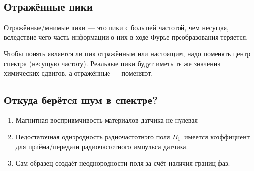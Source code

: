 \documentclass[12pt, a4paper, oneside]{article}	%
\begin{document}
	\subsection {Отражённые пики}

	Отражённые{\slash}мнимые пики --- это пики с большей частотой, чем несущая, вследствие чего
	часть информации о них в ходе Фурье преобразования теряется.

	Чтобы понять является ли пик отражённым или настоящим, надо поменять центр спектра (несущую
	частоту). Реальные пики будут иметь те же значения химических сдвигов, а отражённые --- поменяют.

	\subsection {Откуда берётся шум в спектре?}

		\begin{enumerate}
			\item
				Магнитная восприимчивость материалов датчика не нулевая

			\item
				Недостаточная однородность радиочастотного поля $B_1$: имеется коэффициент для
				приёма{\slash}передачи радиочастотного импульса датчика.

			\item
				Сам образец создаёт неоднородности поля за счёт наличия границ фаз.
		\end{enumerate}
\end{document}
